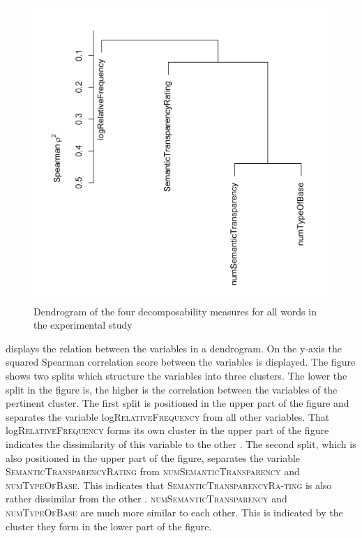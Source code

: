  \begin{figure}
 	
 	\includegraphics[scale=0.5]{images/Experiment/clusterAnalysisDecomposabilityExperimentAllTokens.png}
 	\caption{ Dendrogram of the four decomposability measures for all words in the experimental study}
 	\label{fig:cluster experiment all affixes}
 \end{figure}
 
 displays the relation between the variables in a dendrogram. On the y-axis the squared Spearman correlation score between the variables is displayed. 
The figure shows two splits which structure the variables into three clusters. The lower the split in the figure is, the higher is the correlation between the variables of the pertinent cluster.
The first split is positioned in the upper part of the figure and separates the  variable log\textsc{RelativeFrequency} from all other variables. That log\textsc{RelativeFrequency} forms its own cluster in the upper part of the figure indicates the dissimilarity of this variable to the other . 
The second split, which is also positioned in the upper part of the figure, separates the variable \textsc{SemanticTransparencyRating} from \textsc{numSemanticTransparency} and \textsc{numTypeOfBase}. This indicates that \textsc{SemanticTransparencyRa-ting} is also rather dissimilar from the other . 
\textsc{numSemanticTransparency} and \textsc{numTypeOfBase} are much more similar to each other. This is indicated by the cluster they form in the lower part of the figure. 

